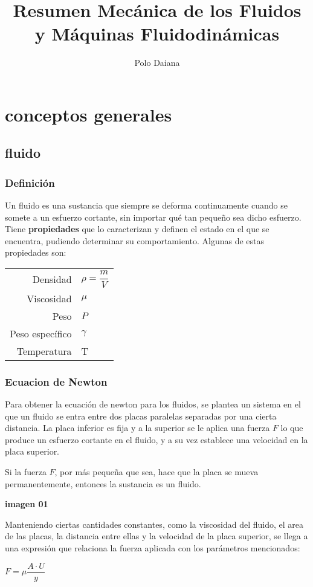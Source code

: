\documentclass[11pt,a4paper]{article}
\title{Resumen Mecánica de los Fluidos y  Máquinas Fluidodinámicas}
\author{Polo Daiana}
\begin{document}
	\section{conceptos generales}
	\subsection{fluido}
	\subsubsection{Definición}
	Un fluido es una sustancia que siempre se deforma continuamente cuando se somete a un esfuerzo cortante, sin importar qué tan pequeño sea dicho esfuerzo.\\

	Tiene \textbf{propiedades} que lo caracterizan y definen el estado en el que se encuentra, pudiendo determinar su comportamiento. Algunas de estas propiedades son: \\
	\begin{center}
		\begin{tabular} {r l}
			Densidad & $\rho = \dfrac{m}{V}$\\
			Viscosidad & $\mu$\\
			Peso & $P$\\
			Peso específico & $\gamma$ \\
			Temperatura & T \\
		\end{tabular}
	\end{center}


\subsubsection{Ecuacion de Newton}
Para obtener la ecuación de newton para los fluidos, se plantea un sistema en el que un fluido se entra entre dos placas paralelas separadas por una cierta distancia. La placa inferior es fija y a la superior se le aplica una fuerza $F$ lo que produce un esfuerzo cortante en el fluido, y a su vez establece una velocidad en la placa superior.

Si la fuerza $F$, por más pequeña que sea, hace que la placa se mueva permanentemente, entonces la sustancia es un fluido.

\begin{center}
	\textbf{imagen 01}
\end{center}

Manteniendo ciertas cantidades constantes, como la viscosidad del fluido, el area de las placas, la distancia entre ellas y la velocidad de la placa superior, se llega a una expresión que relaciona la fuerza aplicada con los parámetros mencionados:
\begin{center}
	$F = \mu \dfrac{A \cdot U}{y}$
\end{center}
\end{document}
